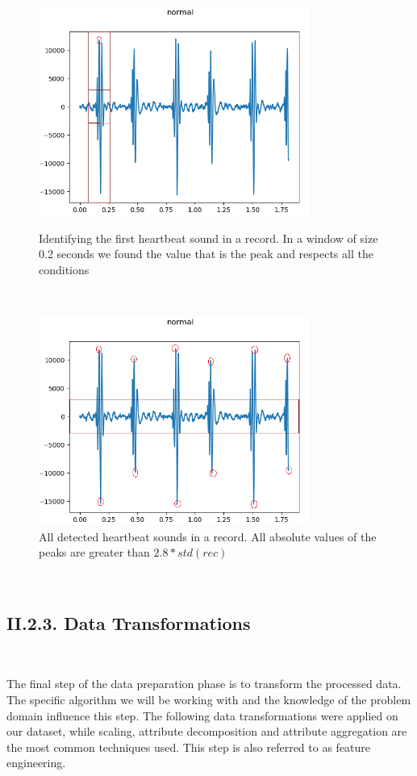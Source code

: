 \documentclass[11pt, a4papper]{report}
\theoremstyle{plain}
\theoremstyle{definition}
\theoremstyle{definition}
\theoremstyle{proposition}
\begin{document}
\begin{figure}[H]
\includegraphics[width=9cm]{n1a.png}
\centering
\caption{Identifying the first heartbeat sound in a record. In a window of size 0.2 seconds we found the value that is the peak and respects all the conditions}
\

\includegraphics[width=9cm]{n1c.png}
\centering
\caption{All detected heartbeat sounds in a record. All absolute values of the peaks are greater than $2.8 * std(rec)$}
\end{figure}
\

\subsection*{II.2.3. Data Transformations}

\

The final step of the data preparation phase is to transform the processed data. The specific algorithm we will be working with and the knowledge of the problem domain influence this step. The following data transformations were applied on our dataset, while scaling, attribute decomposition and attribute aggregation are the most common techniques used. This step is also referred to as feature engineering.
\\
\end{document}
